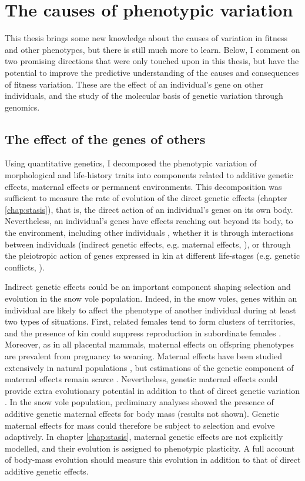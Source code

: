 \section{The causes of phenotypic variation}
This thesis brings some new knowledge about the causes of variation in fitness and other phenotypes, but there is still much more to learn. Below, I comment on two promising directions that were only touched upon in this thesis, but have the potential to improve the predictive understanding of the causes and consequences of fitness variation. These are the effect of an individual's gene on other individuals, and the study of the molecular basis of genetic variation through genomics.

\subsection{The effect of the genes of others}
Using quantitative genetics, I decomposed the phenotypic variation of morphological and life-history traits into components related to additive genetic effects, maternal effects or permanent environments. This decomposition was sufficient to measure the rate of evolution of the direct genetic effects (chapter \ref{chap:stasis}), that is, the direct action of an individual's genes on its own body.
Nevertheless, an individual's genes have effects reaching out beyond its body, to the environment, including other individuals \parencite{Dawkins1982}, whether it is through interactions between individuals (indirect genetic effects, e.g. maternal effects, \cite{McAdam2014}), or through the pleiotropic action of genes expressed in kin at different life-stages (e.g. genetic conflicts, \cite{Trivers1974}).

Indirect genetic effects could be an important component shaping selection and evolution in the snow vole population. Indeed, in the snow voles, genes within an individual are likely to affect the phenotype of another individual during at least two types of situations. First, related females tend to form clusters of territories, and the presence of kin could suppress reproduction in subordinate females \parencite{Garcia-Navas2016}. Moreover, as in all placental mammals, maternal effects on offspring phenotypes are prevalent from pregnancy to weaning. 
Maternal effects have been studied extensively in natural populations \parencite{Wolf2009}, but estimations of the genetic component of maternal effects remain scarce \parencite{McAdam2014}. Nevertheless, genetic maternal effects could provide extra evolutionary potential in addition to that of direct genetic variation \parencite{Mcglothlin2014, McAdam2014, Mcfarlane2015}. In the snow vole population, preliminary analyses showed the presence of additive genetic maternal effects for body mass (results not shown). Genetic maternal effects for mass could therefore be subject to selection and evolve adaptively. In chapter \ref{chap:stasis}, maternal genetic effects are not explicitly modelled, and their evolution is assigned to phenotypic plasticity. A full account of body-mass evolution should measure this evolution in addition to that of direct additive genetic effects. 

